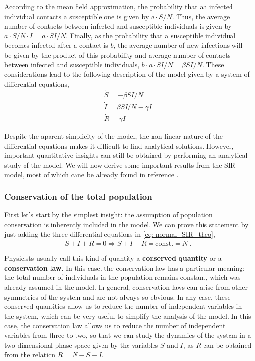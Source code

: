 According to the mean field approximation, the probability that an infected
individual contacts a susceptible one is given by $a\cdot S/N$. Thus, the
average number of contacts between infected and susceptible individuals is
given by $a\cdot S/N\cdot I=a\cdot SI/N$. Finally, as the probability that a
susceptible individual becomes infected after a contact is $b$, the average
number of new infections will be given by the product of this probability and
average number of contacts between infected and susceptible individuals,
$b\cdot a\cdot SI/N=\beta SI/N$. These considerations lead to the following
description of the model given by a system of differential equations,
\begin{equation}\label{eq: normal_SIR_theo}
  \begin{array}{l}
    \dot{S}=-\beta SI/N          \\
    \dot{I}=\beta SI/N -\gamma I \\
    \dot{R}=\gamma I \ ,
  \end{array}
\end{equation}

Despite the aparent simplicity of the model, the non-linear nature of the
differential equations makes it difficult to find analytical solutions.
However, important quantitative insights can still be obtained by performing an
analytical study of the model. We will now derive some important results from
the SIR model, most of which cane be already found in reference
\cite{Murray_book}.

\subsubsection*{Conservation of the total population}

First let's start by the simplest insight: the assumption of population
conservation is inherently included in the model. We can prove this statement
by just adding the three differential equations in \cref{eq: normal_SIR_theo},
\begin{equation}
  \dot{S}+\dot{I}+\dot{R}=0\Longrightarrow S+I+R=\mathrm{const.}=N \ .
\end{equation}

Physicists usually call this kind of quantity a \textbf{conserved quantity}
or a \textbf{conservation law}. In this case, the conservation law has a
particular meaning: the total number of individuals in the population remains
constant, which was already assumed in the model. In general, conservation laws
can arise from other symmetries of the system and are not always so obvious. In
any case, these conserved quantities allow us to reduce the number of
independent variables in the system, which can be very useful to simplify the
analysis of the model. In this case, the conservation law allows us to reduce
the number of independent variables from three to two, so that we can study the
dynamics of the system in a two-dimensional phase space given by the variables
$S$ and $I$, as $R$ can be obtained from the relation $R=N-S-I$.

